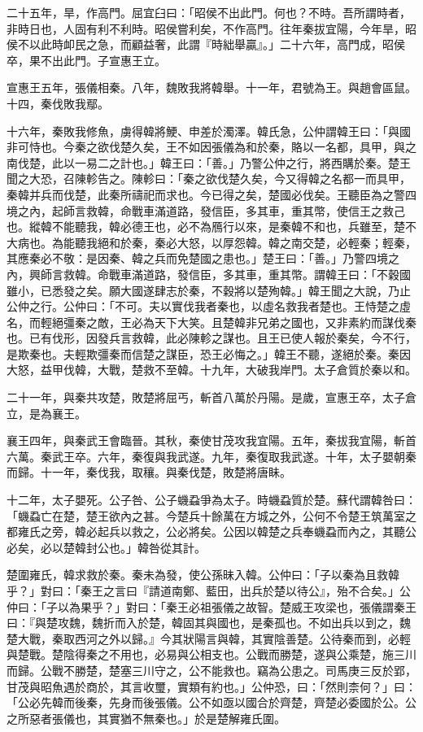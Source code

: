 \begin{pinyinscope}
二十五年，旱，作高門。屈宜臼曰：「昭侯不出此門。何也？不時。吾所謂時者，非時日也，人固有利不利時。昭侯嘗利矣，不作高門。往年秦拔宜陽，今年旱，昭侯不以此時卹民之急，而顧益奢，此謂『時絀舉贏』。」二十六年，高門成，昭侯卒，果不出此門。子宣惠王立。

宣惠王五年，張儀相秦。八年，魏敗我將韓舉。十一年，君號為王。與趙會區鼠。十四，秦伐敗我鄢。

十六年，秦敗我修魚，虜得韓將鯁、申差於濁澤。韓氏急，公仲謂韓王曰：「與國非可恃也。今秦之欲伐楚久矣，王不如因張儀為和於秦，賂以一名都，具甲，與之南伐楚，此以一易二之計也。」韓王曰：「善。」乃警公仲之行，將西購於秦。楚王聞之大恐，召陳軫告之。陳軫曰：「秦之欲伐楚久矣，今又得韓之名都一而具甲，秦韓并兵而伐楚，此秦所禱祀而求也。今已得之矣，楚國必伐矣。王聽臣為之警四境之內，起師言救韓，命戰車滿道路，發信臣，多其車，重其幣，使信王之救己也。縱韓不能聽我，韓必德王也，必不為鴈行以來，是秦韓不和也，兵雖至，楚不大病也。為能聽我絕和於秦，秦必大怒，以厚怨韓。韓之南交楚，必輕秦；輕秦，其應秦必不敬：是因秦、韓之兵而免楚國之患也。」楚王曰：「善。」乃警四境之內，興師言救韓。命戰車滿道路，發信臣，多其車，重其幣。謂韓王曰：「不穀國雖小，已悉發之矣。願大國遂肆志於秦，不穀將以楚殉韓。」韓王聞之大說，乃止公仲之行。公仲曰：「不可。夫以實伐我者秦也，以虛名救我者楚也。王恃楚之虛名，而輕絕彊秦之敵，王必為天下大笑。且楚韓非兄弟之國也，又非素約而謀伐秦也。已有伐形，因發兵言救韓，此必陳軫之謀也。且王已使人報於秦矣，今不行，是欺秦也。夫輕欺彊秦而信楚之謀臣，恐王必悔之。」韓王不聽，遂絕於秦。秦因大怒，益甲伐韓，大戰，楚救不至韓。十九年，大破我岸門。太子倉質於秦以和。

二十一年，與秦共攻楚，敗楚將屈丐，斬首八萬於丹陽。是歲，宣惠王卒，太子倉立，是為襄王。

襄王四年，與秦武王會臨晉。其秋，秦使甘茂攻我宜陽。五年，秦拔我宜陽，斬首六萬。秦武王卒。六年，秦復與我武遂。九年，秦復取我武遂。十年，太子嬰朝秦而歸。十一年，秦伐我，取穰。與秦伐楚，敗楚將唐眛。

十二年，太子嬰死。公子咎、公子蟣蝨爭為太子。時蟣蝨質於楚。蘇代謂韓咎曰：「蟣蝨亡在楚，楚王欲內之甚。今楚兵十餘萬在方城之外，公何不令楚王筑萬室之都雍氏之旁，韓必起兵以救之，公必將矣。公因以韓楚之兵奉蟣蝨而內之，其聽公必矣，必以楚韓封公也。」韓咎從其計。

楚圍雍氏，韓求救於秦。秦未為發，使公孫昧入韓。公仲曰：「子以秦為且救韓乎？」對曰：「秦王之言曰『請道南鄭、藍田，出兵於楚以待公』，殆不合矣。」公仲曰：「子以為果乎？」對曰：「秦王必祖張儀之故智。楚威王攻梁也，張儀謂秦王曰：『與楚攻魏，魏折而入於楚，韓固其與國也，是秦孤也。不如出兵以到之，魏楚大戰，秦取西河之外以歸。』今其狀陽言與韓，其實陰善楚。公待秦而到，必輕與楚戰。楚陰得秦之不用也，必易與公相支也。公戰而勝楚，遂與公乘楚，施三川而歸。公戰不勝楚，楚塞三川守之，公不能救也。竊為公患之。司馬庚三反於郢，甘茂與昭魚遇於商於，其言收璽，實類有約也。」公仲恐，曰：「然則柰何？」曰：「公必先韓而後秦，先身而後張儀。公不如亟以國合於齊楚，齊楚必委國於公。公之所惡者張儀也，其實猶不無秦也。」於是楚解雍氏圍。


\end{pinyinscope}
